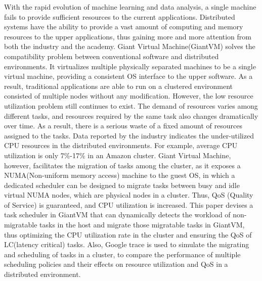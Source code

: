 \begin{englishabstract}


With the rapid evolution of machine learning and data analysis, a single machine fails to provide sufficient resources to the current applications. Distributed systems have the ability to provide a vast amount of computing and memory resources to the upper applications, thus gaining more and more attention from both the industry and the academy. Giant Virtual Machine(GiantVM) solves the compatibility problem between conventional software and distributed environments. It virtualizes multiple physically separated machines to be a single virtual machine, providing a consistent OS interface to the upper software. As a result, traditional applications are able to run on a clustered environment consisted of multiple nodes without any modification. However, the low resource utilization problem still continues to exist. The demand of resources varies among different tasks, and resources required by the same task also changes dramatically over time. As a result, there is a serious waste of a fixed amount of resources assigned to the tasks. Data reported by the industry indicates the under-utilized CPU resources in the distributed environments. For example, average CPU utilization is only 7\%-17\% in an Amazon cluster. Giant Virtual Machine, however, facilitates the migration of tasks among the cluster, as it exposes a NUMA(Non-uniform memory access) machine to the guest OS, in which a dedicated scheduler can be designed to migrate tasks between busy and idle virtual NUMA nodes, which are physical nodes in a cluster. Thus, QoS (Quality of Service) is guaranteed, and CPU utilization is increased. This paper devises a task scheduler in GiantVM that can dynamically detects the workload of non-migratable tasks in the host and migrate those migratable tasks in GiantVM, thus optimizing the CPU utilization rate in the cluster and ensuring the QoS of LC(latency critical) tasks. Also, Google trace is used to simulate the migrating and scheduling of tasks in a cluster, to compare the performance of multiple scheduling policies and their effects on resource utilization and QoS in a distributed environment.

\end{englishabstract}

